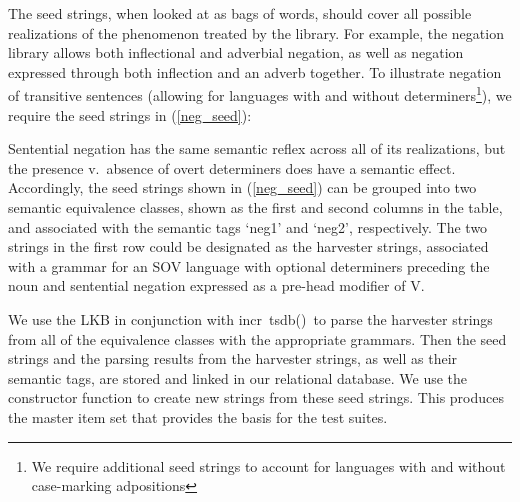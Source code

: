 \documentclass[11pt]{article}
\newcommand{\itsdb}{\mbox{\sf \lbrack incr tsdb()\rbrack}}
\begin{document}
The seed strings, when looked at as bags of words, should cover all
possible realizations of the phenomenon treated by the library. For
example, the negation library allows both inflectional and adverbial
negation, as well as negation expressed through both inflection and an
adverb together.  To illustrate negation of transitive sentences
(allowing for languages with and without determiners\footnote{We
require additional seed strings to account for languages with and
without case-marking adpositions}), we require the seed strings in
(\ref{neg_seed}):

%
Sentential negation has the same semantic reflex across all
of its realizations, but the presence v.\ absence of overt determiners
does have a semantic effect.  Accordingly, the seed strings shown in
(\ref{neg_seed}) can be grouped into two semantic equivalence classes,
shown as the first and second columns in the table, and associated with
the semantic tags `neg1' and `neg2', respectively.  The two strings
in the first row could be designated as the harvester strings, associated
with a grammar for an SOV language with optional determiners preceding
the noun and sentential negation expressed as a pre-head modifier of V.

We use the LKB in conjunction with \itsdb\ to parse the harvester strings from all of
the equivalence classes with the appropriate grammars.  Then the seed strings and the parsing results from the harvester strings, as well as their semantic tags, are stored and linked in our relational database.  We use the constructor function to create new strings from these seed strings.  This produces the master item set that provides the basis for the test suites.
\end{document}
